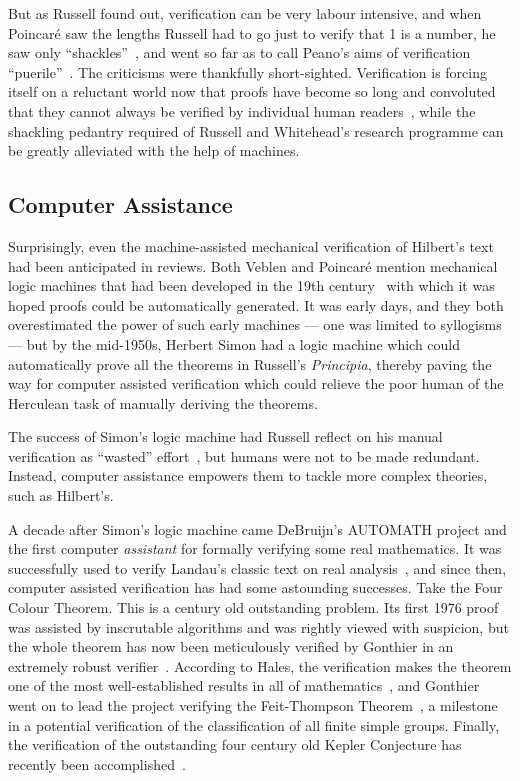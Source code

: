 But as Russell found out, verification can be very labour intensive, and when Poincar\'{e} saw the lengths Russell had to go just to verify that 1 is a number, he saw only ``shackles''~\cite{PoincareShackles}, and went so far as to call Peano's aims of verification ``puerile''~\cite{PoincareReview}. The criticisms were thankfully short-sighted. Verification is forcing itself on a reluctant world now that proofs have become so long and convoluted that they cannot always be verified by individual human readers~\cite{WhitherMathematics}, while the shackling pedantry required of Russell and Whitehead's research programme can be greatly alleviated with the help of machines.

\subsection{Computer Assistance}
Surprisingly, even the machine-assisted mechanical verification of Hilbert's text had been anticipated in reviews. Both Veblen and Poincar\'{e} mention mechanical logic machines that had been developed in the 19th century~\cite{LogicMachines} with which it was hoped proofs could be automatically generated. It was early days, and they both overestimated the power of such early machines --- one was limited to syllogisms --- but by the mid-1950s, Herbert Simon had a logic machine which could automatically prove all the theorems in Russell's \emph{Principia}, thereby paving the way for computer assisted verification which could relieve the poor human of the Herculean task of manually deriving the theorems. 

The success of Simon's logic machine had Russell reflect on his manual verification as ``wasted'' effort~\cite{SimonObituary}, but humans were not to be made redundant. Instead, computer assistance empowers them to tackle more complex theories, such as Hilbert's.

A decade after Simon's logic machine came DeBruijn's AUTOMATH project and the first computer \emph{assistant} for formally verifying some real mathematics. It was successfully used to verify Landau's classic text on real analysis~\cite{LandauGrundlagen,LandauAUTOMATH}, and since then, computer assisted verification has had some astounding successes. Take the Four Colour Theorem. This is a century old outstanding problem. Its first 1976 proof was assisted by inscrutable algorithms and was rightly viewed with suspicion, but the whole theorem has now been meticulously verified by Gonthier in an extremely robust verifier~\cite{GonthierFCT}. According to Hales, the verification makes the theorem one of the most well-established results in all of mathematics~\cite{HalesFormalProof}, and Gonthier went on to lead the project verifying the Feit-Thompson Theorem~\cite{FeitThompson}, a milestone in a potential verification of the classification of all finite simple groups. Finally, the verification of the outstanding four century old Kepler Conjecture has recently been accomplished~\cite{flyspeck}. 

